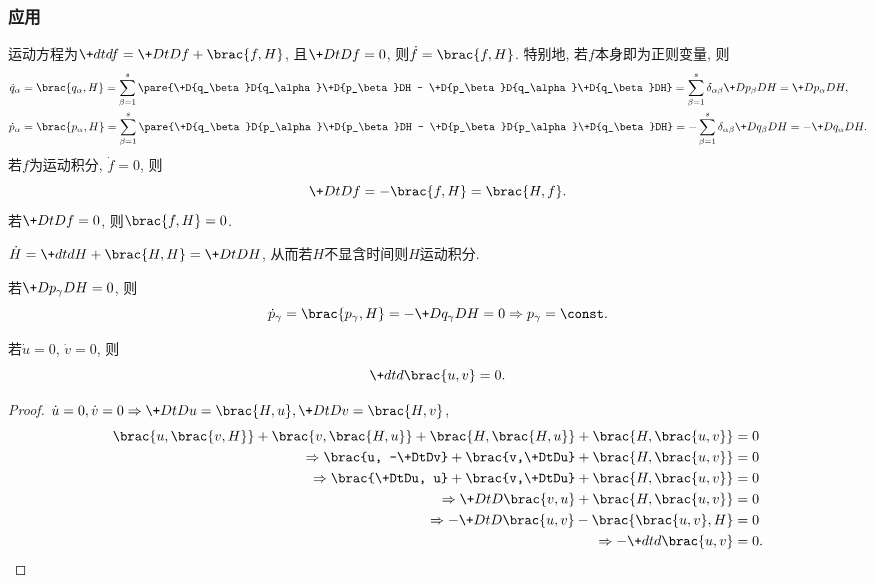 \documentclass{ctexart}
\begin{document}

\subsubsection{应用} %
\label{ssub:应用}

运动方程为$\+dtdf = \+DtDf + \brac{f,H}$, 且$\displaystyle \+DtDf = 0$, 则$\dot{f} = \brac{f,H}$. 特别地, 若$f$本身即为正则变量, 则
\begin{align*}
    \dot{q}_\alpha &= \brac{q_\alpha,H} = \sum_{\beta=1}^s \pare{\+D{q_\beta}D{q_\alpha}\+D{p_\beta}DH - \+D{p_\beta}D{q_\alpha}\+D{q_\beta}DH} = \sum_{\beta=1}^s \delta_{\alpha\beta}\+D{p_\beta}DH = \+D{p_\alpha}DH, \\
    \dot{p}_\alpha &= \brac{p_\alpha,H} = \sum_{\beta=1}^s \pare{\+D{q_\beta}D{p_\alpha}\+D{p_\beta}DH - \+D{p_\beta}D{p_\alpha}\+D{q_\beta}DH} = -\sum_{\beta=1}^s \delta_{\alpha\beta}\+D{q_\beta}DH = -\+D{q_\alpha}DH.
\end{align*}
若$f$为运动积分, $\dot{f} = 0$, 则
\[ \+DtDf = -\brac{f,H} = \brac{H,f}. \]
若$\displaystyle \+DtDf = 0$, 则$\brac{f,H} = 0$.
\begin{ex}
    $\displaystyle \dot{H} = \+dtdH + \brac{H,H} = \+DtDH$, 从而若$H$不显含时间则$H$运动积分.
\end{ex}
\begin{ex}
    若$\displaystyle \+D{p_\gamma}DH = 0$, 则
    \[ \dot{p}_\gamma = \brac{p_\gamma,H} = -\+D{q_\gamma}DH = 0\Rightarrow p_\gamma = \const. \]
\end{ex}
\begin{theorem}[Poisson定理]
    若$\dot{u} = 0$, $\dot{v} = 0$, 则
    \[ \+dtd{}\brac{u,v} = 0. \]
\end{theorem}
\begin{proof}
    $\dot{u} = 0,\dot{v} = 0 \Rightarrow \displaystyle \+DtDu = \brac{H,u},\+DtDv = \brac{H,v}$,
    \begin{align*}
        \brac{u,\brac{v,H}} + \brac{v,\brac{H,u}} + \brac{H,\brac{H,u}} + \brac{H,\brac{u,v}} &= 0 \\
        \Rightarrow \brac{u, -\+DtDv} + \brac{v,\+DtDu} + \brac{H,\brac{u,v}} &= 0 \\
        \Rightarrow \brac{\+DtDu, u} + \brac{v,\+DtDu} + \brac{H,\brac{u,v}} &= 0 \\
        \Rightarrow \+DtD{}\brac{v,u} + \brac{H,\brac{u,v}} &= 0 \\
        \Rightarrow -\+DtD{}\brac{u,v} - \brac{\brac{u,v},H} &= 0 \\
        \Rightarrow -\+dtd{}\brac{u,v} &= 0. \qedhere
    \end{align*}
\end{proof}
\end{document}
